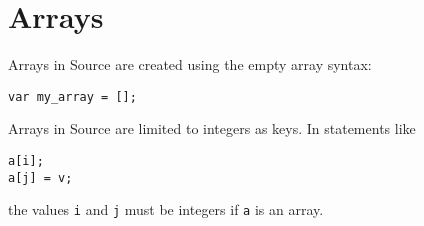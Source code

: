 \section*{Arrays}

Arrays in Source are created using the empty array syntax:
\begin{lstlisting}
var my_array = [];
\end{lstlisting}
Arrays in Source are limited to integers as keys.
In statements like
\begin{lstlisting}
a[i];
a[j] = v;
\end{lstlisting}
the values \lstinline{i} and \lstinline{j} must be integers if \lstinline{a} is an array.

